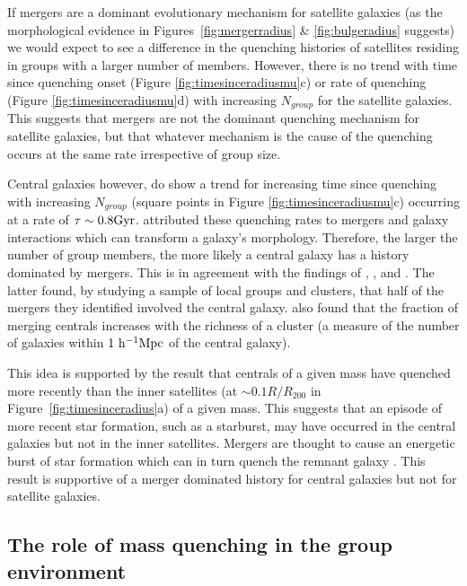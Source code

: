 \documentclass[useAMS,usenatbib]{mn2e}
\begin{document}
If mergers are a dominant evolutionary mechanism for satellite galaxies (as the morphological evidence in Figures~\ref{fig:mergerradius} \& \ref{fig:bulgeradius} suggests) we would expect to see a difference in the quenching histories of satellites residing in groups with a larger number of members. However, there is no trend with time since quenching onset (Figure \ref{fig:timesinceradiusmu}c) or rate of quenching (Figure \ref{fig:timesinceradiusmu}d) with increasing $N_{group}$ for the satellite galaxies. This suggests that mergers are not the dominant quenching mechanism for satellite galaxies, but that whatever mechanism is the cause of the quenching occurs at the same rate irrespective of group size. 

Central galaxies however, do show a trend for increasing time since quenching with increasing $N_{group}$ (square points in Figure \ref{fig:timesinceradiusmu}c) occurring at a rate of $\tau \sim 0.8 \rm{Gyr}$. \cite{smethurst15} attributed these quenching rates to mergers and galaxy interactions which can transform a galaxy's morphology. Therefore, the larger the number of group members, the more likely a central galaxy has a history dominated by mergers. This is in agreement with the findings of \citet{lin10}, \citet{ellison10}, \citet{lidman13} and \citet{mcintosh08}. The latter found, by studying a sample of local groups and clusters, that half of the mergers they identified involved the central galaxy. \cite{liu09} also found that the fraction of merging centrals increases with the richness of a cluster (a measure of the number of galaxies within $1~\rm{h}^{-1}\rm{Mpc}$ of the central galaxy).

This idea is supported by the result that centrals of a given mass have quenched more recently than the inner satellites (at $\sim0.1R/R_{200}$ in Figure~\ref{fig:timesinceradius}a) of a given mass. This suggests that an episode of more recent star formation, such as a starburst, may have occurred in the central galaxies but not in the inner satellites. Mergers are thought to cause an energetic burst of star formation which can in turn quench the remnant galaxy \citep{hopkins05, treister12, pontzen16}. This result is supportive of a merger dominated history for central galaxies but not for satellite galaxies.

\subsection{The role of mass quenching in the group environment}\label{sec:rolemassenv}
\end{document}
